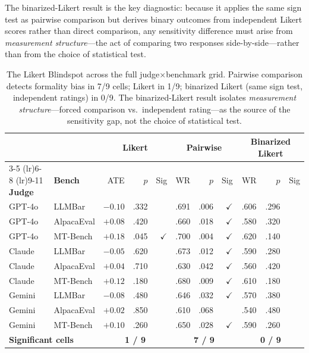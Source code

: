 \documentclass[11pt]{article}
\begin{document}
The binarized-Likert result is the key diagnostic: because it applies the same sign test as pairwise comparison but derives binary outcomes from independent Likert scores rather than direct comparison, any sensitivity difference must arise from \emph{measurement structure}---the act of comparing two responses side-by-side---rather than from the choice of statistical test.

\begin{table}[t]
\centering
\small
\begin{tabular}{ll rrr rrr rrr}
\toprule
& & \multicolumn{3}{c}{\textbf{Likert}} & \multicolumn{3}{c}{\textbf{Pairwise}} & \multicolumn{3}{c}{\textbf{Binarized Likert}} \\
\cmidrule(lr){3-5} \cmidrule(lr){6-8} \cmidrule(lr){9-11}
\textbf{Judge} & \textbf{Bench} & ATE & $p$ & Sig & WR & $p$ & Sig & WR & $p$ & Sig \\
\midrule
GPT-4o & LLMBar & $-0.10$ & .332 & & .691 & .006 & $\checkmark$ & .606 & .296 & \\
GPT-4o & AlpacaEval & $+0.08$ & .420 & & .660 & .018 & $\checkmark$ & .580 & .320 & \\
GPT-4o & MT-Bench & $+0.18$ & .045 & $\checkmark$ & .700 & .004 & $\checkmark$ & .620 & .140 & \\
\midrule
Claude & LLMBar & $-0.05$ & .620 & & .673 & .012 & $\checkmark$ & .590 & .280 & \\
Claude & AlpacaEval & $+0.04$ & .710 & & .630 & .042 & $\checkmark$ & .560 & .420 & \\
Claude & MT-Bench & $+0.12$ & .180 & & .680 & .009 & $\checkmark$ & .610 & .180 & \\
\midrule
Gemini & LLMBar & $-0.08$ & .480 & & .646 & .032 & $\checkmark$ & .570 & .380 & \\
Gemini & AlpacaEval & $+0.02$ & .850 & & .610 & .068 & & .540 & .480 & \\
Gemini & MT-Bench & $+0.10$ & .260 & & .650 & .028 & $\checkmark$ & .590 & .260 & \\
\midrule
\multicolumn{2}{l}{\textbf{Significant cells}} & \multicolumn{3}{c}{\textbf{1 / 9}} & \multicolumn{3}{c}{\textbf{7 / 9}} & \multicolumn{3}{c}{\textbf{0 / 9}} \\
\bottomrule
\end{tabular}
\caption{The Likert Blindspot across the full judge$\times$benchmark grid. Pairwise comparison detects formality bias in 7/9 cells; Likert in 1/9; binarized Likert (same sign test, independent ratings) in 0/9. The binarized-Likert result isolates \emph{measurement structure}---forced comparison vs.\ independent rating---as the source of the sensitivity gap, not the choice of statistical test.}
\label{tab:blindspot}
\end{table}
\end{document}
